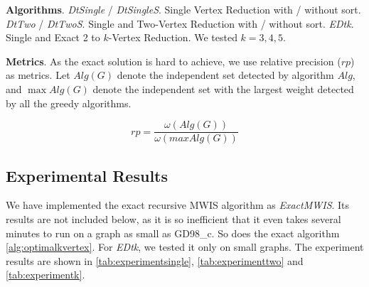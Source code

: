 \documentclass[sigconf, nonacm]{acmart}
\begin{document}

\noindent\textbf{Algorithms}. \emph{DtSingle} / \emph{DtSingleS}. Single Vertex Reduction with / without sort. \emph{DtTwo} / \emph{DtTwoS}. Single and Two-Vertex Reduction with / without sort. \emph{EDtk}. Single and Exact 2 to $k$-Vertex Reduction. We tested $k=3,4,5$.





\noindent\textbf{Metrics}. As the exact solution is hard to achieve, we use relative precision ($rp$) as metrics. Let $Alg(G)$ denote the independent set detected by algorithm $Alg$, and $\max Alg(G)$ denote the independent set with the largest weight detected by all the greedy algorithms.

\begin{equation}
rp = \frac{\omega(Alg(G))}{\omega(maxAlg(G))}
\end{equation}

\subsection{Experimental Results}

We have implemented the exact recursive MWIS algorithm as \emph{ExactMWIS}. Its results are not included below, as it is so inefficient that it even takes several minutes to run on a graph as small as GD98\_c. So does the exact algorithm \autoref{alg:optimalkvertex}. For \emph{EDtk}, we tested it only on small graphs. The experiment results are shown in \autoref{tab:experimentsingle}, \autoref{tab:experimenttwo} and \autoref{tab:experimentk}.
\end{document}
